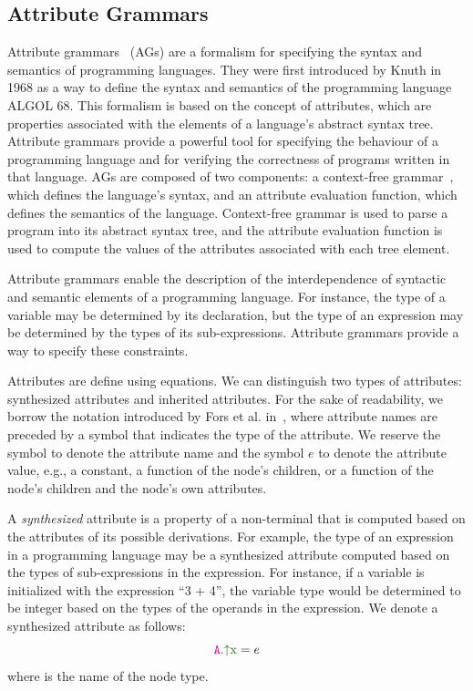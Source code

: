 \subsection{Attribute Grammars}
\label{chap:attr-grammars}
Attribute grammars~\cite{knuth1968semantics} (AGs) are a formalism for specifying
the syntax and semantics of programming languages.
They were first introduced by Knuth in 1968 as a way to define the syntax and semantics of the programming
language ALGOL 68. This formalism is based on the concept of attributes,
which are properties associated with the elements of a language's abstract syntax tree.
Attribute grammars provide a powerful tool for specifying the behaviour of a programming
language and for verifying the correctness of programs written in that language.
%
AGs are composed of two components: a context-free grammar~\cite{CREMERS197586},
which defines the language's syntax, and an attribute evaluation function,
which defines the semantics of the language. Context-free grammar is used to
parse a program into its abstract syntax tree, and the attribute evaluation function
is used to compute the values of the attributes associated with each tree element.

Attribute grammars enable the description of the
interdependence of syntactic and semantic elements of a programming language.
For instance, the type of a variable may be determined by its declaration,
but the type of an expression may be determined by the types of its sub-expressions.
Attribute grammars provide a way to specify these constraints.

Attributes are define using equations. We can distinguish two types of
attributes: synthesized attributes and inherited attributes.
For the sake of readability, we borrow the notation introduced by Fors et al. in~\cite{fors2020patterns},
where attribute names are preceded by a symbol that indicates the type of the attribute.
We reserve the symbol  to denote the attribute name and the symbol $e$ to denote the attribute value,
e.g., a constant, a function of the node's children, or a function of the node's children
and the node's own attributes.

A \emph{synthesized} attribute is a property of a non-terminal that is computed
based on the attributes of its possible derivations. For example, the type of an expression
in a programming language may be a synthesized attribute computed based
on the types of sub-expressions in the expression. For instance, if a variable is initialized
with the expression ``3 + 4'', the variable type would be determined to
be integer based on the types of the operands in the expression.
We denote a synthesized attribute as follows:
\begin{equation*}
  \Asyn{A}{x} = e
  \end{equation*}
where  is the name of the node type.

